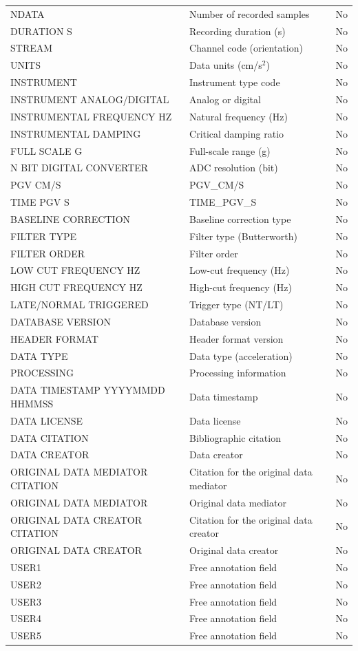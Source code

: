 \begin{longtable}{
  >{\raggedright\arraybackslash}p{4cm}  >{\raggedright\arraybackslash}p{8cm}  >{\centering\arraybackslash}p{2cm}
}
NDATA & Number of recorded samples & No \\
DURATION S & Recording duration (s) & No \\
STREAM & Channel code (orientation) & No \\
UNITS & Data units (cm/s$^2$) & No \\
INSTRUMENT & Instrument type code & No \\
INSTRUMENT ANALOG/DIGITAL & Analog or digital & No \\
INSTRUMENTAL FREQUENCY HZ & Natural frequency (Hz) & No \\
INSTRUMENTAL DAMPING & Critical damping ratio & No \\
FULL SCALE G & Full-scale range (g) & No \\
N BIT DIGITAL CONVERTER & ADC resolution (bit) & No \\
PGV CM/S & PGV_CM/S & No \\
TIME PGV S & TIME_PGV_S & No \\
BASELINE CORRECTION & Baseline correction type & No \\
FILTER TYPE & Filter type (Butterworth) & No \\
FILTER ORDER & Filter order & No \\
LOW CUT FREQUENCY HZ & Low-cut frequency (Hz) & No \\
HIGH CUT FREQUENCY HZ & High-cut frequency (Hz) & No \\
LATE/NORMAL TRIGGERED & Trigger type (NT/LT) & No \\
DATABASE VERSION & Database version & No \\
HEADER FORMAT & Header format version & No \\
DATA TYPE & Data type (acceleration) & No \\
PROCESSING & Processing information & No \\
DATA TIMESTAMP YYYYMMDD HHMMSS & Data timestamp & No \\
DATA LICENSE & Data license & No \\
DATA CITATION & Bibliographic citation & No \\
DATA CREATOR & Data creator & No \\
ORIGINAL DATA MEDIATOR CITATION & Citation for the original data mediator & No \\
ORIGINAL DATA MEDIATOR & Original data mediator & No \\
ORIGINAL DATA CREATOR CITATION & Citation for the original data creator & No \\
ORIGINAL DATA CREATOR & Original data creator & No \\
USER1 & Free annotation field & No \\
USER2 & Free annotation field & No \\
USER3 & Free annotation field & No \\
USER4 & Free annotation field & No \\
USER5 & Free annotation field & No \\
\end{longtable}